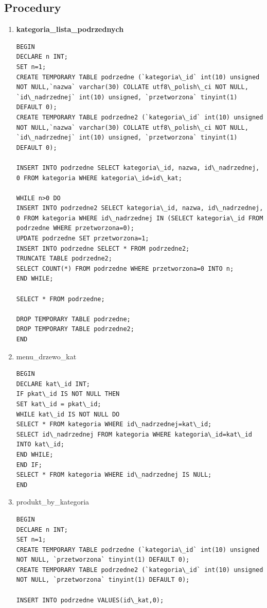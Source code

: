 \subsection{Procedury}
\begin{enumerate}
\item \textbf{kategoria\_lista\_podrzednych}
\begin{verbatim}
BEGIN
DECLARE n INT;
SET n=1;
CREATE TEMPORARY TABLE podrzedne (`kategoria\_id` int(10) unsigned NOT NULL,`nazwa` varchar(30) COLLATE utf8\_polish\_ci NOT NULL,
`id\_nadrzednej` int(10) unsigned, `przetworzona` tinyint(1) DEFAULT 0);
CREATE TEMPORARY TABLE podrzedne2 (`kategoria\_id` int(10) unsigned NOT NULL,`nazwa` varchar(30) COLLATE utf8\_polish\_ci NOT NULL,
`id\_nadrzednej` int(10) unsigned, `przetworzona` tinyint(1) DEFAULT 0);

INSERT INTO podrzedne SELECT kategoria\_id, nazwa, id\_nadrzednej, 0 FROM kategoria WHERE kategoria\_id=id\_kat;

WHILE n>0 DO
INSERT INTO podrzedne2 SELECT kategoria\_id, nazwa, id\_nadrzednej, 0 FROM kategoria WHERE id\_nadrzednej IN (SELECT kategoria\_id FROM podrzedne WHERE przetworzona=0);
UPDATE podrzedne SET przetworzona=1;
INSERT INTO podrzedne SELECT * FROM podrzedne2;
TRUNCATE TABLE podrzedne2;
SELECT COUNT(*) FROM podrzedne WHERE przetworzona=0 INTO n;
END WHILE;

SELECT * FROM podrzedne;

DROP TEMPORARY TABLE podrzedne;
DROP TEMPORARY TABLE podrzedne2;
END
\end{verbatim}
\item menu\_drzewo\_kat
\begin{verbatim}
BEGIN
DECLARE kat\_id INT;
IF pkat\_id IS NOT NULL THEN
SET kat\_id = pkat\_id;
WHILE kat\_id IS NOT NULL DO
SELECT * FROM kategoria WHERE id\_nadrzednej=kat\_id;
SELECT id\_nadrzednej FROM kategoria WHERE kategoria\_id=kat\_id INTO kat\_id;
END WHILE;
END IF;
SELECT * FROM kategoria WHERE id\_nadrzednej IS NULL;
END
\end{verbatim}
\item produkt\_by\_kategoria
\begin{verbatim}
BEGIN
DECLARE n INT;
SET n=1;
CREATE TEMPORARY TABLE podrzedne (`kategoria\_id` int(10) unsigned NOT NULL, `przetworzona` tinyint(1) DEFAULT 0);
CREATE TEMPORARY TABLE podrzedne2 (`kategoria\_id` int(10) unsigned NOT NULL, `przetworzona` tinyint(1) DEFAULT 0);

INSERT INTO podrzedne VALUES(id\_kat,0);


\end{verbatim}
\end{enumerate}
